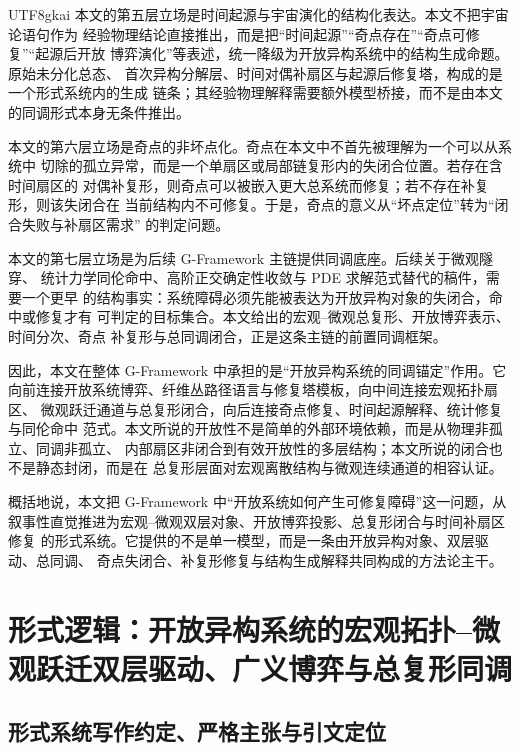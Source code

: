 \documentclass[12pt]{article}
\newcommand{\GFramework}{\textsf{G-Framework}}
\begin{document}
\begin{CJK*}{UTF8}{gkai}
本文的第五层立场是时间起源与宇宙演化的结构化表达。本文不把宇宙论语句作为
经验物理结论直接推出，而是把“时间起源”“奇点存在”“奇点可修复”“起源后开放
博弈演化”等表述，统一降级为开放异构系统中的结构生成命题。原始未分化总态、
首次异构分解层、时间对偶补扇区与起源后修复塔，构成的是一个形式系统内的生成
链条；其经验物理解释需要额外模型桥接，而不是由本文的同调形式本身无条件推出。

本文的第六层立场是奇点的非坏点化。奇点在本文中不首先被理解为一个可以从系统中
切除的孤立异常，而是一个单扇区或局部链复形内的失闭合位置。若存在含时间扇区的
对偶补复形，则奇点可以被嵌入更大总系统而修复；若不存在补复形，则该失闭合在
当前结构内不可修复。于是，奇点的意义从“坏点定位”转为“闭合失败与补扇区需求”
的判定问题。

本文的第七层立场是为后续 \GFramework{} 主链提供同调底座。后续关于微观隧穿、
统计力学同伦命中、高阶正交确定性收敛与 PDE 求解范式替代的稿件，需要一个更早
的结构事实：系统障碍必须先能被表达为开放异构对象的失闭合，命中或修复才有
可判定的目标集合。本文给出的宏观--微观总复形、开放博弈表示、时间分次、奇点
补复形与总同调闭合，正是这条主链的前置同调框架。

因此，本文在整体 \GFramework{} 中承担的是“开放异构系统的同调锚定”作用。它
向前连接开放系统博弈、纤维丛路径语言与修复塔模板，向中间连接宏观拓扑扇区、
微观跃迁通道与总复形闭合，向后连接奇点修复、时间起源解释、统计修复与同伦命中
范式。本文所说的开放性不是简单的外部环境依赖，而是从物理非孤立、同调非孤立、
内部扇区非闭合到有效开放性的多层结构；本文所说的闭合也不是静态封闭，而是在
总复形层面对宏观离散结构与微观连续通道的相容认证。

概括地说，本文把 \GFramework{} 中“开放系统如何产生可修复障碍”这一问题，从
叙事性直觉推进为宏观--微观双层对象、开放博弈投影、总复形闭合与时间补扇区修复
的形式系统。它提供的不是单一模型，而是一条由开放异构对象、双层驱动、总同调、
奇点失闭合、补复形修复与结构生成解释共同构成的方法论主干。

\setcounter{tocdepth}{3}
\setcounter{secnumdepth}{3}
\tableofcontents
\clearpage

\section{形式逻辑：开放异构系统的宏观拓扑--微观跃迁双层驱动、广义博弈与总复形同调}
\label{sec:tex43-ch1}

\subsection{形式系统写作约定、严格主张与引文定位}
\label{subsec:tex43-convention}


\end{CJK*}
\end{document}
